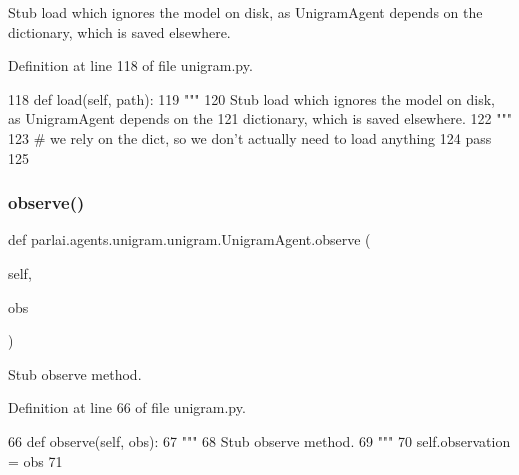 \begin{DoxyVerb}Stub load which ignores the model on disk, as UnigramAgent depends on the
dictionary, which is saved elsewhere.
\end{DoxyVerb}
 

Definition at line 118 of file unigram.\+py.


\begin{DoxyCode}
118     \textcolor{keyword}{def }load(self, path):
119         \textcolor{stringliteral}{"""}
120 \textcolor{stringliteral}{        Stub load which ignores the model on disk, as UnigramAgent depends on the}
121 \textcolor{stringliteral}{        dictionary, which is saved elsewhere.}
122 \textcolor{stringliteral}{        """}
123         \textcolor{comment}{# we rely on the dict, so we don't actually need to load anything}
124         \textcolor{keywordflow}{pass}
125 \end{DoxyCode}
\mbox{\label{classparlai_1_1agents_1_1unigram_1_1unigram_1_1UnigramAgent_a2c0cb628c4cc600b0968e6161d7a139a}} 
\subsubsection{\texorpdfstring{observe()}{observe()}}
{\footnotesize\ttfamily def parlai.\+agents.\+unigram.\+unigram.\+Unigram\+Agent.\+observe (\begin{DoxyParamCaption}\item[{}]{self,  }\item[{}]{obs }\end{DoxyParamCaption})}

\begin{DoxyVerb}Stub observe method.
\end{DoxyVerb}
 

Definition at line 66 of file unigram.\+py.


\begin{DoxyCode}
66     \textcolor{keyword}{def }observe(self, obs):
67         \textcolor{stringliteral}{"""}
68 \textcolor{stringliteral}{        Stub observe method.}
69 \textcolor{stringliteral}{        """}
70         self.observation = obs
71 
\end{DoxyCode}
\mbox{\label{classparlai_1_1agents_1_1unigram_1_1unigram_1_1UnigramAgent_ae0178adc22b61bc37632eed426f853df}} 
